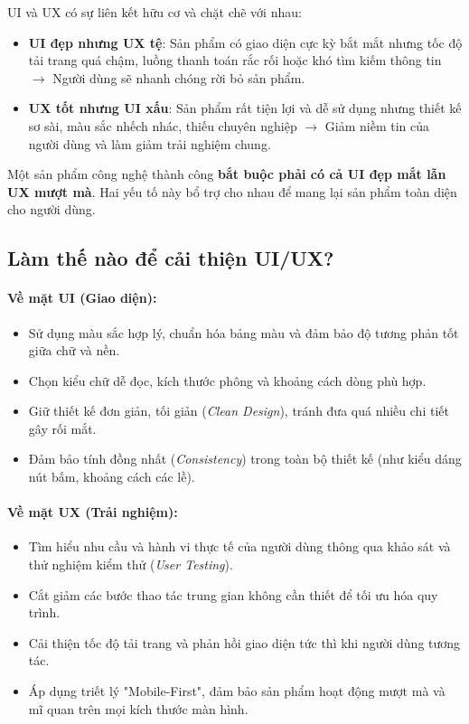 \documentclass[11pt,oneside]{book}
\begin{document}
UI và UX có sự liên kết hữu cơ và chặt chẽ với nhau:
\begin{itemize}[leftmargin=1.8em, itemsep=3pt, parsep=0pt]
    \item \textbf{UI đẹp nhưng UX tệ}: Sản phẩm có giao diện cực kỳ bắt mắt nhưng tốc độ tải trang quá chậm, luồng thanh toán rắc rối hoặc khó tìm kiếm thông tin $\rightarrow$ Người dùng sẽ nhanh chóng rời bỏ sản phẩm.
    \item \textbf{UX tốt nhưng UI xấu}: Sản phẩm rất tiện lợi và dễ sử dụng nhưng thiết kế sơ sài, màu sắc nhếch nhác, thiếu chuyên nghiệp $\rightarrow$ Giảm niềm tin của người dùng và làm giảm trải nghiệm chung.
\end{itemize}

\begin{noteBox}
Một sản phẩm công nghệ thành công \textbf{bắt buộc phải có cả UI đẹp mắt lẫn UX mượt mà}. Hai yếu tố này bổ trợ cho nhau để mang lại sản phẩm toàn diện cho người dùng.
\end{noteBox}

\subsection{Làm thế nào để cải thiện UI/UX?}

\paragraph{Về mặt UI (Giao diện):}
\begin{itemize}[leftmargin=1.8em, itemsep=2pt, parsep=0pt]
    \item Sử dụng màu sắc hợp lý, chuẩn hóa bảng màu và đảm bảo độ tương phản tốt giữa chữ và nền.
    \item Chọn kiểu chữ dễ đọc, kích thước phông và khoảng cách dòng phù hợp.
    \item Giữ thiết kế đơn giản, tối giản (\textit{Clean Design}), tránh đưa quá nhiều chi tiết gây rối mắt.
    \item Đảm bảo tính đồng nhất (\textit{Consistency}) trong toàn bộ thiết kế (như kiểu dáng nút bấm, khoảng cách các lề).
\end{itemize}

\paragraph{Về mặt UX (Trải nghiệm):}
\begin{itemize}[leftmargin=1.8em, itemsep=2pt, parsep=0pt]
    \item Tìm hiểu nhu cầu và hành vi thực tế của người dùng thông qua khảo sát và thử nghiệm kiểm thử (\textit{User Testing}).
    \item Cắt giảm các bước thao tác trung gian không cần thiết để tối ưu hóa quy trình.
    \item Cải thiện tốc độ tải trang và phản hồi giao diện tức thì khi người dùng tương tác.
    \item Áp dụng triết lý "Mobile-First", đảm bảo sản phẩm hoạt động mượt mà và mĩ quan trên mọi kích thước màn hình.
\end{itemize}
\end{document}

